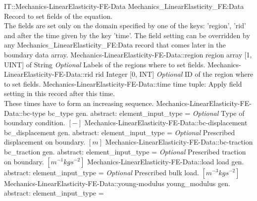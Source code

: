 \begin{RecordType}
	{IT::Mechanics-LinearElasticity-FE-Data}
	{Mechanics{\_}LinearElasticity{\_}FE:Data}
	{}%
	{}%
	{{{Record to set fields of the equation.}\\{
The fields are set only on the domain specified by one of the keys: 'region', 'rid'}\\{
and after the time given by the key 'time'. The field setting can be overridden by}\\{
 any Mechanics{\_}LinearElasticity{\_}FE:Data record that comes later in the boundary data array.}%
}}
		\RecKey
			{Mechanics-LinearElasticity-FE-Data::region}
			{region}
			{{array [1, UINT] of }{String}}{}
			{ \it{Optional}}
			{{{Labels of the regions where to set fields. }%
}}
		\RecKey
			{Mechanics-LinearElasticity-FE-Data::rid}
			{rid}
			{{Integer [0, INT]}}{}
			{ \it{Optional}}
			{{{ID of the region where to set fields.}%
}}
		\RecKey
			{Mechanics-LinearElasticity-FE-Data::time}
			{time}
			{{tuple: }}{}
			{ }
			{{{Apply field setting in this record after this time.}\\{
These times have to form an increasing sequence.}%
}}
		\RecKey
			{Mechanics-LinearElasticity-FE-Data::bc-type}
			{bc{\_}type}
			{{gen. abstract: }}{{element{\_}input{\_}type}{ = }}
			{ \it{Optional}}
			{{{Type of boundary condition. }{$[-]$}%
}}
		\RecKey
			{Mechanics-LinearElasticity-FE-Data::bc-displacement}
			{bc{\_}displacement}
			{{gen. abstract: }}{{element{\_}input{\_}type}{ = }}
			{ \it{Optional}}
			{{{Prescribed displacement on boundary. }{$[m]$}%
}}
		\RecKey
			{Mechanics-LinearElasticity-FE-Data::bc-traction}
			{bc{\_}traction}
			{{gen. abstract: }}{{element{\_}input{\_}type}{ = }}
			{ \it{Optional}}
			{{{Prescribed traction on boundary. }{$[m^{-1}kgs^{-2}]$}%
}}
		\RecKey
			{Mechanics-LinearElasticity-FE-Data::load}
			{load}
			{{gen. abstract: }}{{element{\_}input{\_}type}{ = }}
			{ \it{Optional}}
			{{{Prescribed bulk load. }{$[m^{-3}kgs^{-2}]$}%
}}
		\RecKey
			{Mechanics-LinearElasticity-FE-Data::young-modulus}
			{young{\_}modulus}
			{{gen. abstract: }}{{element{\_}input{\_}type}{ = }}

\end{RecordType}
